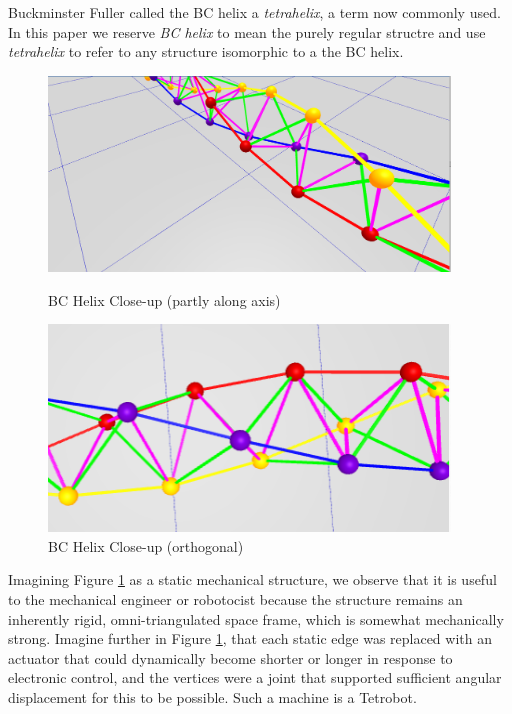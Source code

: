 \documentclass[11pt]{article}
\begin{document}
Buckminster Fuller called the BC helix a \emph{tetrahelix}\cite{fuller1982synergetics},
a term now commonly used. In this paper we reserve \emph{BC helix} to mean the purely regular structre and use \emph{tetrahelix} to refer
to any structure isomorphic to a the BC helix.



\begin{figure}[H]
  \label{fig:closeup}
  \centering
     \includegraphics[width=0.95\textwidth]{figures/BCHelixCloseUp.png}
     \caption{BC Helix Close-up (partly along axis)}
  \centering
     \includegraphics[width=0.95\textwidth]{figures/VerticalCloseUp.png}
     \caption{BC Helix Close-up (orthogonal)}
\end{figure}



Imagining Figure \ref{fig:closeup} as a static mechanical structure,
we observe that it is useful to the mechanical engineer or
robotocist because the structure remains an inherently rigid,
omni-triangulated space frame, which is
somewhat mechanically strong.
Imagine further in Figure \ref{fig:closeup}, that each static edge was replaced with an
actuator that could dynamically become shorter or longer in response to electronic control,
and the vertices were a joint that supported sufficient angular displacement
for this to be possible. Such a machine is a Tetrobot\cite{TetrobotBook}.
\end{document}
